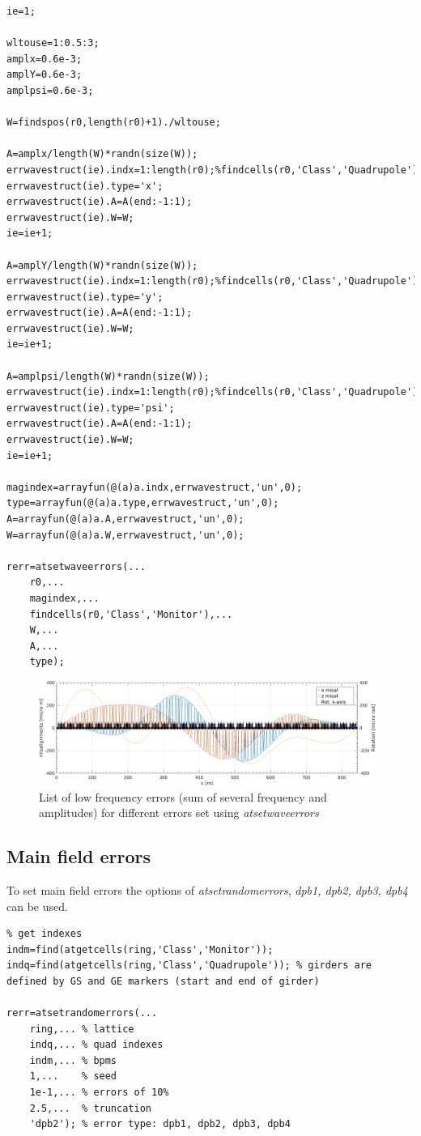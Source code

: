 \begin{lstlisting}
ie=1;

wltouse=1:0.5:3;
amplx=0.6e-3;
amplY=0.6e-3;
amplpsi=0.6e-3;

W=findspos(r0,length(r0)+1)./wltouse;

A=amplx/length(W)*randn(size(W));
errwavestruct(ie).indx=1:length(r0);%findcells(r0,'Class','Quadrupole');
errwavestruct(ie).type='x';
errwavestruct(ie).A=A(end:-1:1);
errwavestruct(ie).W=W;
ie=ie+1;

A=amplY/length(W)*randn(size(W));
errwavestruct(ie).indx=1:length(r0);%findcells(r0,'Class','Quadrupole');
errwavestruct(ie).type='y';
errwavestruct(ie).A=A(end:-1:1);
errwavestruct(ie).W=W;
ie=ie+1;

A=amplpsi/length(W)*randn(size(W));
errwavestruct(ie).indx=1:length(r0);%findcells(r0,'Class','Quadrupole');
errwavestruct(ie).type='psi';
errwavestruct(ie).A=A(end:-1:1);
errwavestruct(ie).W=W;
ie=ie+1;

magindex=arrayfun(@(a)a.indx,errwavestruct,'un',0);
type=arrayfun(@(a)a.type,errwavestruct,'un',0);
A=arrayfun(@(a)a.A,errwavestruct,'un',0);
W=arrayfun(@(a)a.W,errwavestruct,'un',0);

rerr=atsetwaveerrors(...
    r0,...
    magindex,...
    findcells(r0,'Class','Monitor'),...
    W,...
    A,...
    type);

\end{lstlisting}

\begin{figure}[!h]
	\centering
	\includegraphics[width=0.98\textwidth]{./images/Wave/Wave.jpg}
	\caption{List of low frequency errors (sum of several frequency and amplitudes) for different errors set using \emph{atsetwaveerrors}}
	\label{fig:girdxyrol}
\end{figure}


\clearpage
\subsection{Main field errors}
To set main field errors the options of \emph{atsetrandomerrors}, \textit{dpb1, dpb2, dpb3, dpb4} can be used.
\begin{lstlisting}
% get indexes
indm=find(atgetcells(ring,'Class','Monitor'));
indq=find(atgetcells(ring,'Class','Quadrupole')); % girders are defined by GS and GE markers (start and end of girder)

rerr=atsetrandomerrors(...
    ring,... % lattice
    indq,... % quad indexes
    indm,... % bpms
    1,...    % seed
    1e-1,... % errors of 10%
    2.5,...  % truncation
    'dpb2'); % error type: dpb1, dpb2, dpb3, dpb4
		
\end{lstlisting}


